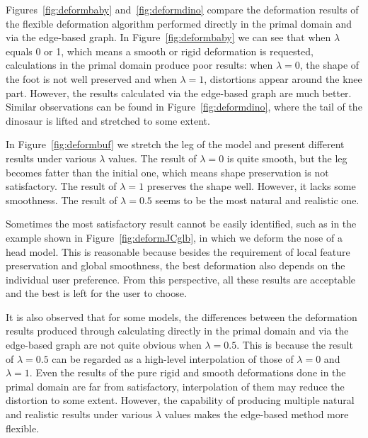 Figures~\ref{fig:deformbaby}  and~\ref{fig:deformdino} compare the
deformation results of the flexible deformation algorithm performed
directly in the primal domain and via the edge-based graph. In
Figure~\ref{fig:deformbaby} we can see that when $\lambda$ equals 0
or 1, which means a smooth or rigid deformation is requested,
calculations in the primal domain produce poor results: when
$\lambda=0$, the shape of the foot is not well preserved and when
$\lambda=1$, distortions appear around the knee part. However, the
results calculated via the edge-based graph are much better. Similar
observations can be found in Figure~\ref{fig:deformdino}, where the
tail of the dinosaur is lifted and stretched to some extent.

In Figure~\ref{fig:deformbuf}  we stretch the leg of the model and
present different results under various $\lambda$ values. The result
of $\lambda=0$ is quite smooth, but the leg becomes fatter than the
initial one, which means shape preservation is not satisfactory. The
result of $\lambda=1$ preserves the shape well. However, it lacks
some smoothness. The result of $\lambda=0.5$ seems to be the most
natural and realistic one.

Sometimes the most satisfactory  result cannot be easily identified,
such as in the example shown in Figure~\ref{fig:deformJCglb}, in
which we deform the nose of a head model. This is reasonable because
besides the requirement of local feature preservation and global
smoothness, the best deformation also depends on the individual user
preference. From this perspective, all these results are acceptable
and the best is left for the user to choose.

It is also observed that for some  models, the differences between
the deformation results produced through calculating directly in the
primal domain and via the edge-based graph are not quite obvious
when $\lambda=0.5$. This is because the result of $\lambda=0.5$ can
be regarded as a high-level interpolation of those of $\lambda=0$
and $\lambda=1$. Even the results of the pure rigid and smooth
deformations done in the primal domain are far from satisfactory,
interpolation of them may reduce the distortion to some extent.
However, the capability of producing multiple natural and realistic
results under various $\lambda$ values makes the edge-based method
more flexible.

